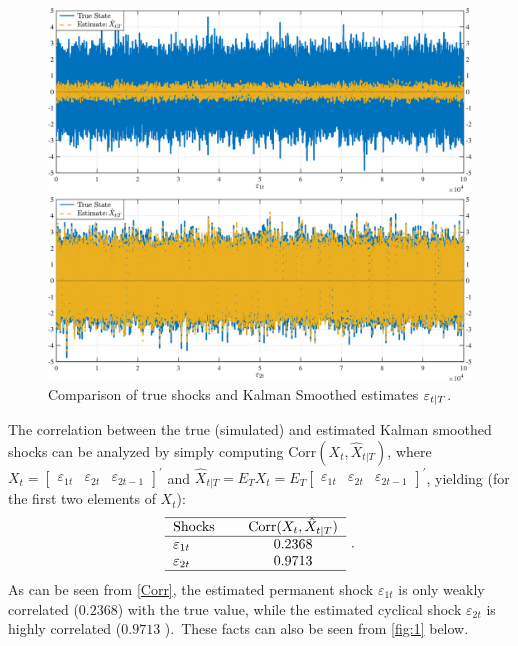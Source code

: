 \documentclass[a4paper,final,12pt]{article}
\begin{document}
\begin{figure}[h]
\centering
\includegraphics[width=1\textwidth,trim={0 0 0
0},clip,angle=00]{HP97_plots.pdf}
\caption{Comparison of true shocks and Kalman Smoothed estimates $\protect%
\varepsilon _{t|T}$.}
\label{fig:1}
\end{figure}
The correlation between the true (simulated) and estimated Kalman smoothed
shocks can be analyzed by simply computing $\mathrm{Corr}(X_{t},\hat{X}%
_{t|T})$, where $X_{t}=%
\begin{bmatrix}
\varepsilon _{1t} & \varepsilon _{2t} & \varepsilon _{2t-1}%
\end{bmatrix}%
^{\prime }$ and $\hat{X}_{t|T}=E_{T}X_{t}=E_{T}%
\begin{bmatrix}
\varepsilon _{1t} & \varepsilon _{2t} & \varepsilon _{2t-1}%
\end{bmatrix}%
^{\prime }$, yielding (for the first two elements of $X_{t}$):%
\begin{equation}
\begin{tabular}{lcc}
\hline
Shocks &  & $\mathrm{Corr}(X_{t},\hat{X}_{t|T})$ \\ \hline
$\varepsilon _{1t}$ &  & $0.2368$ \\ 
$\varepsilon _{2t}$ &  & $0.9713$ \\ \hline
\end{tabular}%
~.  \label{Corr}
\end{equation}%
As can be seen from \ref{Corr}, the estimated permanent shock $\varepsilon
_{1t}$ is only weakly correlated ($0.2368$) with the true value, while the
estimated cyclical shock $\varepsilon _{2t}$ is highly correlated ($0.9713$%
).\ These facts can also be seen from \autoref{fig:1} below.
\end{document}
